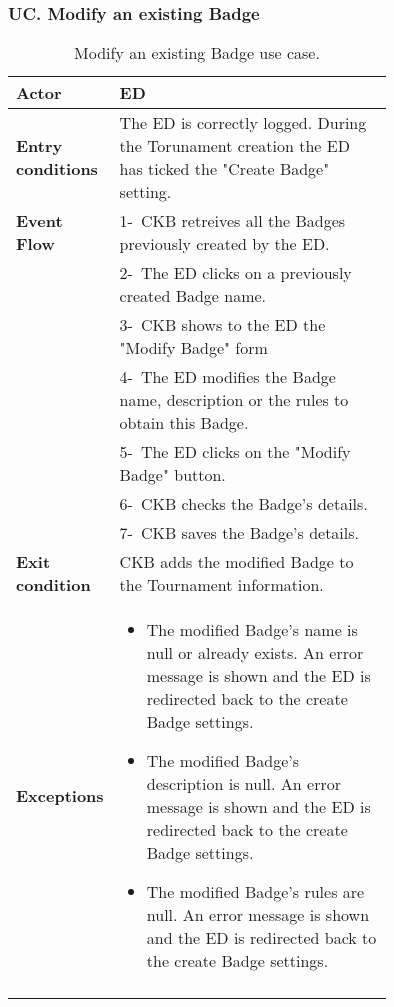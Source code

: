 \subsubsection*{UC\cuc . Modify an existing Badge}
\begin{center}
    \begin{longtable}{|l|p{0.75\linewidth}|}
        \hline
        \textbf{Actor}            & ED \\
        \hline
        \textbf{Entry conditions} & The ED is correctly logged. During the Torunament creation the ED has ticked the "Create Badge" setting.        \\
        \hline
        \textbf{Event Flow}       & 1-\ CKB retreives all the Badges previously created by the ED. \\
        & 2-\ The ED clicks on a previously created Badge name. \\
        & 3-\ CKB shows to the ED the "Modify Badge" form \\
        & 4-\ The ED modifies the Badge name, description or the rules to obtain this Badge. \\
        & 5-\ The ED clicks on the "Modify Badge" button. \\
        & 6-\ CKB checks the Badge's details. \\
        & 7-\ CKB saves the Badge's details. \\
        \hline
        \textbf{Exit condition}   & CKB adds the modified Badge to the Tournament information. \\
        \hline
        \textbf{Exceptions}        & \begin{itemize}
            \item The modified Badge's name is null or already exists. An error message is shown and the ED is redirected back to the create Badge settings.
            \item The modified Badge's description is null. An error message is shown and the ED is redirected back to the create Badge settings.
            \item The modified Badge's rules are null. An error message is shown and the ED is redirected back to the create Badge settings.
         \end{itemize}    \\
        \hline
        \caption{ Modify an existing Badge use case.}
        \label{tab: modify_badge_use_case}
    \end{longtable}
\end{center}




